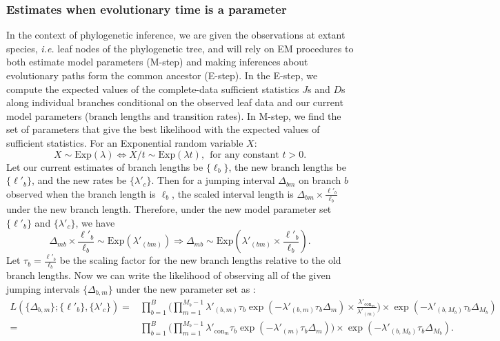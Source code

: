 \documentclass[11pt]{article}
\newcommand{\context}{\ensuremath{\mathrm{con}}}
\begin{document}
\subsubsection{Estimates when evolutionary time is a parameter}
In the context of phylogenetic inference, we are given the
observations at extant species, \textit{i.e.} leaf nodes of the
phylogenetic tree, and will rely on EM procedures to both estimate
model parameters (M-step) and making inferences about evolutionary
paths form the common ancestor (E-step).  In the E-step, we compute
the expected values of the complete-data sufficient statistics $J$s
and $D$s along individual branches conditional on the observed leaf
data and our current model parameters (branch lengths and transition
rates). In M-step, we find the set of parameters that give the best
likelihood with the expected values of sufficient
statistics. For an Exponential random variable
$X$:
\[ X \sim \text{Exp}(\lambda) \Leftrightarrow X/t \sim
\text{Exp}(\lambda t), ~~\text{for any constant $t>0$.}
\]
Let our current estimates of branch lengths be $\{\ell_b\}$, the new branch lengths be $\{\ell'_b\}$, and the new rates be $\{\lambda'_c\}$. Then for a jumping
interval $\Delta_{bm}$ on branch $b$ observed when the branch length is $\ell_b$, the scaled
interval length is $\Delta_{bm}\times \frac{\ell'_b}{\ell_b}$ under the new branch length. Therefore, under the new model parameter set $\{\ell'_b\}$ and $\{\lambda'_c\}$, we have
\[
\Delta_{mb}\times \frac{\ell'_b}{\ell_b} \sim \text{Exp}(\lambda'_{(bm)}) \Rightarrow
\Delta_{mb} \sim \text{Exp}(\lambda'_{(bm)} \times \frac{\ell'_b}{\ell_b}).
\]
Let $\tau_b = \frac{\ell'_b}{\ell_b}$ be the scaling factor for the new branch lengths relative to the old branch lengths. Now we can write the likelihood of observing all of the given jumping
intervals $\{\Delta_{b,m}\}$ under the new parameter set as :
\begin{equation}\label{eqn:liknew}
\begin{aligned}
L(\{\Delta_{b,m}\}; \{\ell'_b\}, \{\lambda'_c\})
= & \prod\limits_{b=1}^B\Bigg(\prod\limits_{m=1}^{M_b-1}
   \lambda'_{(b,m)}\tau_b
   \exp(-\lambda'_{(b,m)}\tau_b\Delta_m) \times \frac{\lambda'_{\context{}_m}}{\lambda'_{(m)}}
\Bigg) \times \exp(-\lambda'_{(b,M_b)}\tau_b\Delta_{M_b})\\
= & \prod\limits_{b=1}^B\Bigg(
\prod\limits_{m=1}^{M_b-1}\lambda'_{\context{}_m}\tau_b\exp(-\lambda'_{(m)}\tau_b\Delta_m)
\Bigg)\times \exp(-\lambda'_{(b,M_b)}\tau_b\Delta_{M_b}).
\end{aligned}
\end{equation}
\end{document}
